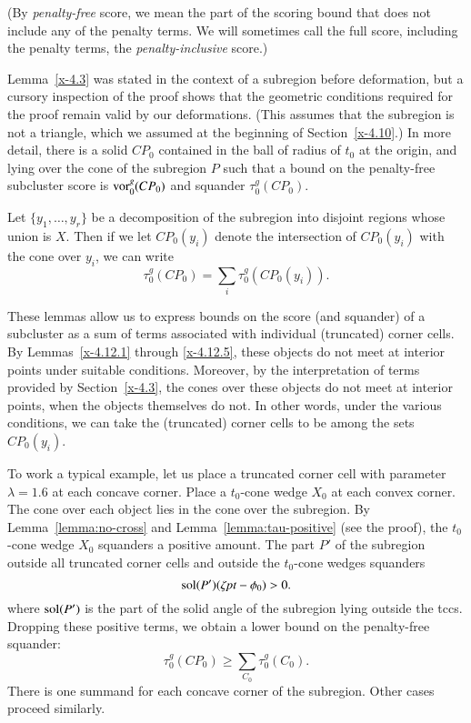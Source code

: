 \begin{definition}
(By {\it penalty-free\/} score, we mean the part of the scoring
bound that does not include any of the penalty terms.  We will
sometimes call the full score, including the penalty terms, the
{\it penalty-inclusive\/} score.)
\end{definition}

Lemma~\ref{x-4.3} was stated in the context of a subregion before
deformation, but a cursory inspection of the proof shows that the
geometric conditions required for the proof remain valid by our
deformations. (This assumes that the subregion is not a triangle, which
we assumed at the beginning of Section~\ref{x-4.10}.) In more detail,
there is a solid $CP_0$ contained in the ball of radius of $t_0$ at the
origin, and lying over the cone of the subregion $P$ such that a bound
on the penalty-free subcluster score is $\operatorname{vor}^g_0(CP_0)$ and squander
$\tau^g_0(CP_0)$.


Let $\{y_1,\ldots,y_r\}$ be a decomposition of the subregion into
disjoint regions whose union is $X$. Then if we let $CP_0(y_i)$ denote
the intersection of $CP_0(y_i)$ with the cone over $y_i$, we can write
    $$\tau^g_0(CP_0) =\sum_i \tau^g_0(CP_0(y_i)).$$

These lemmas allow us to express bounds on the score (and
squander) of a subcluster as a sum of terms associated with
individual (truncated) corner cells. By Lemmas~\ref{x-4.12.1}
through \ref{x-4.12.5}, these objects do not meet at interior
points under suitable conditions. Moreover, by the interpretation
of terms provided by Section~\ref{x-4.3}, the cones over these
objects do not meet at interior points, when the objects
themselves do not. In other words, under the various conditions,
we can take the (truncated) corner cells to be among the sets
$CP_0(y_i)$.

To work a typical example, let us place a truncated corner cell with
parameter $\lambda=1.6$ at each concave corner.  Place a $t_0$-cone
wedge $X_0$ at each convex corner. The cone over each object lies in the
cone over the subregion. By Lemma~\ref{lemma:no-cross} and
Lemma~\ref{lemma:tau-positive} (see the proof), the $t_0$-cone wedge
$X_0$ squanders a positive amount.  The part $P'$ of the subregion
outside all truncated corner cells and outside the $t_0$-cone wedges
squanders
    $$\operatorname{sol}(P')(\zeta\hbox{\it pt}-\phi_0) > 0.$$
where $\operatorname{sol}(P')$ is the part of the solid angle of the subregion
lying outside the tccs. Dropping these positive terms, we obtain a
lower bound on the penalty-free squander:
    $$\tau^g_0(CP_0) \ge \sum_{C_0} \tau^g_0(C_0).$$
There is one summand for each concave corner of the subregion.
Other cases proceed similarly.


